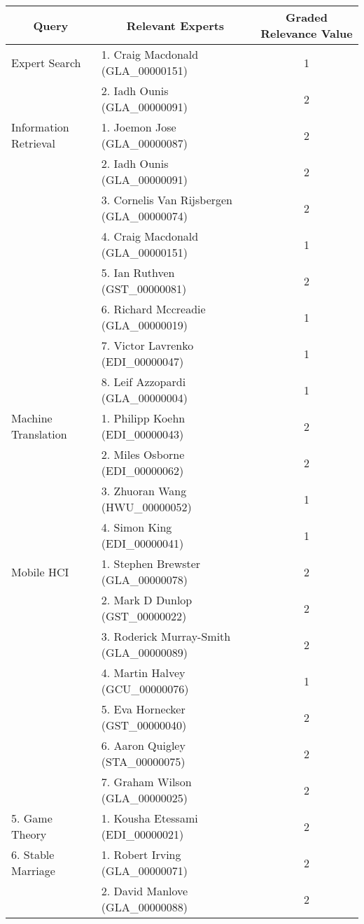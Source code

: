 \footnotesize
\begin{longtable}{|l|l|c|}

\hline \multicolumn{1}{|c|}{\textbf{Query}} & \multicolumn{1}{|c|}{\textbf{Relevant Experts}} & \multicolumn{1}{|c|}{\textbf{Graded Relevance Value}} \\

\hline Expert Search & 1. Craig Macdonald (GLA\_00000151)  & 1 \\
\hline  & 2. Iadh Ounis (GLA\_00000091) & 2 \\
\hline Information Retrieval & 1. Joemon Jose (GLA\_00000087) & 2 \\
\hline  & 2. Iadh Ounis (GLA\_00000091)  & 2 \\
\hline  & 3. Cornelis Van Rijsbergen (GLA\_00000074)  & 2 \\
\hline  & 4. Craig Macdonald (GLA\_00000151) & 1 \\
\hline  & 5. Ian Ruthven (GST\_00000081)  & 2 \\
\hline  & 6. Richard Mccreadie (GLA\_00000019) & 1 \\
\hline  & 7. Victor Lavrenko (EDI\_00000047) & 1 \\
\hline  & 8. Leif  Azzopardi (GLA\_00000004) & 1 \\
\hline Machine Translation & 1. Philipp Koehn (EDI\_00000043) & 2 \\
\hline  & 2. Miles Osborne (EDI\_00000062) & 2 \\
\hline  & 3. Zhuoran Wang (HWU\_00000052) & 1 \\
\hline  & 4. Simon King (EDI\_00000041) & 1 \\
\hline Mobile HCI & 1. Stephen Brewster (GLA\_00000078) & 2 \\
\hline  & 2. Mark D Dunlop (GST\_00000022) & 2 \\
\hline  & 3. Roderick Murray-Smith (GLA\_00000089) & 2 \\
\hline  & 4. Martin Halvey (GCU\_00000076) & 1 \\
\hline  & 5. Eva Hornecker (GST\_00000040) & 2 \\
\hline  & 6. Aaron Quigley (STA\_00000075) & 2 \\
\hline  & 7. Graham Wilson (GLA\_00000025) & 2 \\
\hline 5. Game Theory & 1. Kousha Etessami (EDI\_00000021) & 2 \\
\hline 6. Stable Marriage & 1. Robert Irving (GLA\_00000071) & 2 \\
\hline  & 2. David Manlove (GLA\_00000088) & 2 \\

\end{longtable}
